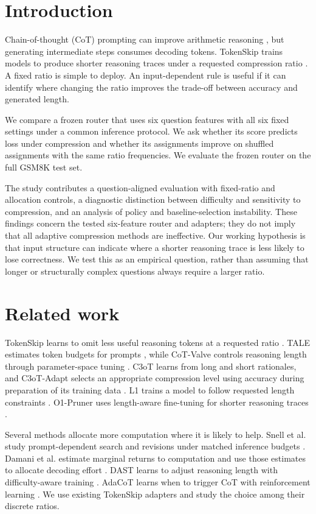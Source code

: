 \documentclass[a4paper,runningheads]{llncs}
\begin{document}
\section{Introduction}
Chain-of-thought (CoT) prompting can improve arithmetic reasoning \cite{wei2022,kojima2022}, but generating intermediate steps consumes decoding tokens. TokenSkip trains models to produce shorter reasoning traces under a requested compression ratio \cite{tokenskip}. A fixed ratio is simple to deploy. An input-dependent rule is useful if it can identify where changing the ratio improves the trade-off between accuracy and generated length.

We compare a frozen router that uses six question features with all six fixed settings under a common inference protocol. We ask whether its score predicts loss under compression and whether its assignments improve on shuffled assignments with the same ratio frequencies. We evaluate the frozen router on the full GSM8K test set.

The study contributes a question-aligned evaluation with fixed-ratio and allocation controls, a diagnostic distinction between difficulty and sensitivity to compression, and an analysis of policy and baseline-selection instability. These findings concern the tested six-feature router and adapters; they do not imply that all adaptive compression methods are ineffective. Our working hypothesis is that input structure can indicate where a shorter reasoning trace is less likely to lose correctness. We test this as an empirical question, rather than assuming that longer or structurally complex questions always require a larger ratio.

\section{Related work}
TokenSkip learns to omit less useful reasoning tokens at a requested ratio \cite{tokenskip}. TALE estimates token budgets for prompts \cite{tale}, while CoT-Valve controls reasoning length through parameter-space tuning \cite{cotvalve}. C3oT learns from long and short rationales, and C3oT-Adapt selects an appropriate compression level using accuracy during preparation of its training data \cite{c3ot}. L1 trains a model to follow requested length constraints \cite{l1}. O1-Pruner uses length-aware fine-tuning for shorter reasoning traces \cite{pruner}.

Several methods allocate more computation where it is likely to help. Snell et al. study prompt-dependent search and revisions under matched inference budgets \cite{snell}. Damani et al. estimate marginal returns to computation and use those estimates to allocate decoding effort \cite{damani}. DAST learns to adjust reasoning length with difficulty-aware training \cite{dast}. AdaCoT learns when to trigger CoT with reinforcement learning \cite{adacot}. We use existing TokenSkip adapters and study the choice among their discrete ratios.
\end{document}
